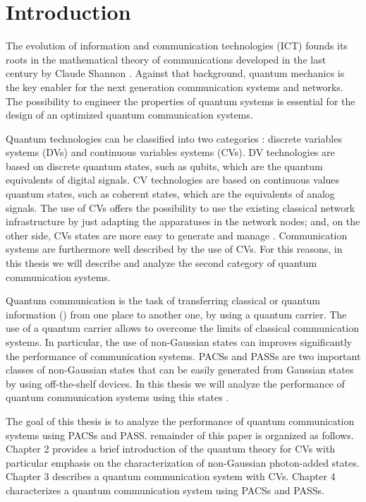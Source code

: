 \chapter{Introduction}
    The evolution of information and communication technologies (ICT) founds its roots in the mathematical
    theory of communications developed in the last century by Claude Shannon \cite{shannon}.
    Against that background, quantum mechanics is the key enabler for the next generation 
    communication systems and networks.
    The possibility to engineer the properties of quantum systems \cite{helstrom3} is essential for 
    the design of an optimized quantum communication systems.
    
    Quantum technologies can be classified into two categories \cite{tesiGuerrini}: discrete 
    variables systems (DVs) and continuous variables systems (CVs). DV technologies are based
    on discrete quantum states, such as qubits, which are the quantum equivalents of digital
    signals. CV technologies are based on continuous values quantum states, such as 
    coherent states, which are the equivalents of analog signals.
    The use of CVs offers the possibility to use the existing classical network
    infrastructure by just adapting the apparatuses in the network nodes; and, on the other
    side, CVs states are more easy to generate and manage \cite{tesiGuerrini}. Communication
    systems are furthermore well described by the use of CVs. 
    For this reasons, in this thesis we will describe and analyze the second category of quantum
    communication systems.

    Quantum communication is the task of transferring classical or quantum information
    (\cite{GueChiWinCon:C20,GueChiWinCon:C19,GueChiCon:C18,ChiConWin:J20}) from one place to another
    one, by using a quantum carrier.
    The use of a quantum carrier allows to overcome the 
    limits of classical communication systems.
    In particular, the use of non-Gaussian states
    can improves significantly the performance of communication systems. 
    PACSs and PASSs are two important classes of non-Gaussian states that can be easily generated 
    from Gaussian states by using off-the-shelf devices. In this thesis we will analyze the 
    performance of quantum communication systems using this states 
    \cite{PACSDisc,GueChiWinCon:C20,GueChiWinCon:C19,GueChiCon:C18}.

    The goal of this thesis is to analyze the performance of quantum 
    communication systems using PACSs and PASS. remainder of this paper is organized as follows. 
    Chapter 2 provides a brief introduction of the quantum theory for CVs with particular emphasis on
    the characterization of non-Gaussian photon-added states. Chapter 3 describes a quantum communication 
    system with CVs. Chapter 4 characterizes a quantum communication system using PACSs and PASSs.
